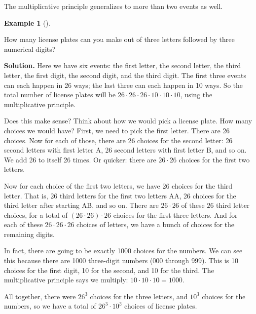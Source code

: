 \documentclass[10pt,]{book}
\theoremstyle{plain}
\theoremstyle{definition}
\newtheorem{example}[theorem]{Example}
\theoremstyle{definition}
\theoremstyle{definition}
\numberwithin{equation}{section}
\begin{document}
    The multiplicative principle generalizes to more than two events as well.
\begin{example}[]\label{example-26}

        How many license plates can you make out of three letters followed by three numerical digits?
\par\medskip\noindent%
\textbf{Solution.}\quad 
        Here we have six events: the first letter, the second letter, the third letter, the first digit, the second digit, and the third digit. The first three events can each happen in 26 ways; the last three can each happen in 10 ways. So the total number of license plates will be \(26\cdot 26\cdot 26 \cdot 10 \cdot 10 \cdot 10\), using the multiplicative principle.
\par

        Does this make sense? Think about how we would pick a license plate. How many choices we would have? First, we need to pick the first letter. There are 26 choices. Now for each of those, there are 26 choices for the second letter: 26 second letters with first letter A, 26 second letters with first letter B, and so on. We add 26 to itself 26 times. Or quicker: there are \(26 \cdot 26\) choices for the first two letters.
\par

        Now for each choice of the first two letters, we have 26 choices for the third letter. That is, 26 third letters for the first two letters AA, 26 choices for the third letter after starting AB, and so on. There are \(26 \cdot 26\) of these \(26\) third letter choices, for a total of \((26\cdot26)\cdot 26\) choices for the first three letters. And for each of these \(26\cdot26\cdot26\) choices of letters, we have a bunch of choices for the remaining digits.
\par

        In fact, there are going to be exactly 1000 choices for the numbers. We can see this because there are 1000 three-digit numbers (000 through 999). This is 10 choices for the first digit, 10 for the second, and 10 for the third. The multiplicative principle says we multiply: \(10\cdot 10 \cdot 10 = 1000\).
\par

        All together, there were \(26^3\) choices for the three letters, and \(10^3\) choices for the numbers, so we have a total of \(26^3 \cdot 10^3\) choices of license plates.
\end{example}
\par
\end{document}
